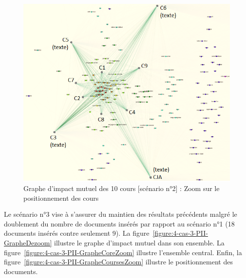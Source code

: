 \begin{figure}[htb!]
\centering
\centerline{  %
\includegraphics[scale=0.7]{4-Experiences/images/cas-2/graphe-Directe-core-courses-written.png}
}
\caption{Graphe d'impact mutuel des 10 cours [scénario n°2] : Zoom sur le positionnement des cours}
\label{figure:4-cas-2-PII-GrapheCoursesZoom}
\end{figure}




\clearpage %
\newpage   %


Le scénario n°3 vise à s'assurer du maintien des résultats précédents malgré le doublement du nombre de documents insérés par rapport au scénario n°1 (18 documents insérés contre seulement 9).
La figure~\ref{figure:4-cas-3-PII-GrapheDezoom} illustre le graphe d'impact mutuel dans son ensemble.
La figure~\ref{figure:4-cas-3-PII-GrapheCoreZoom} illustre l'ensemble central.
Enfin, la figure~\ref{figure:4-cas-3-PII-GrapheCoursesZoom} illustre le positionnement des documents.

